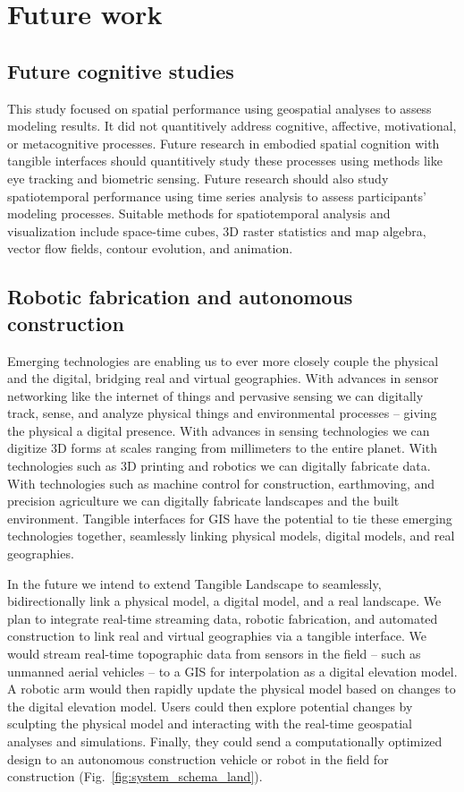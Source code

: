 \documentclass[prodmode,acmtochi]{acmsmall} %
\begin{document}
\section{Future work}
%
\subsection{Future cognitive studies}
%
This study focused on spatial performance
using geospatial analyses to assess modeling results. 
%
It did not quantitively address cognitive, affective, motivational, or metacognitive processes. 
%
Future research in embodied spatial cognition with tangible interfaces 
should quantitively study these processes using methods like 
eye tracking and biometric sensing.  
%
Future research should also study spatiotemporal performance
using time series analysis to assess participants' modeling processes.
%
Suitable methods for spatiotemporal analysis and visualization include 
space-time cubes, 3D raster statistics and map algebra, 
vector flow fields, contour evolution, and animation.

\subsection{Robotic fabrication and autonomous construction}
%
Emerging technologies are enabling us to ever more closely couple the physical and the digital, bridging real and virtual geographies. With advances in sensor networking like the internet of things and pervasive sensing \cite{Ratti2009,Resch2011} we can digitally track, sense, and analyze physical things and environmental processes -- giving the physical a digital presence. With advances in sensing technologies we can digitize 3D forms at scales ranging from millimeters to the entire planet. With technologies such as 3D printing and robotics we can digitally fabricate data. With technologies such as machine control for construction, earthmoving, and precision agriculture we can digitally fabricate landscapes and the built environment. Tangible interfaces for GIS have the potential to tie these emerging technologies together, seamlessly linking physical models, digital models, and real geographies. 

In the future we intend to extend Tangible Landscape to 
seamlessly, bidirectionally link a physical model, a digital model, and a real landscape.
%
We plan to integrate real-time streaming data, 
robotic fabrication, 
and automated construction 
to link real and virtual geographies via a tangible interface. 
%
We would stream real-time topographic data 
from sensors in the field -- such as unmanned aerial vehicles --
to a GIS for interpolation as a digital elevation model. 
%
A robotic arm would then rapidly update the physical model 
based on changes to the digital elevation model. 
%
Users could then explore potential changes by sculpting the physical model
and interacting with the real-time geospatial analyses and simulations. 
Finally, they could send a computationally optimized design 
to an autonomous construction vehicle or robot in the field for construction 
(Fig.~\ref{fig:system_schema_land}). 
\end{document}
